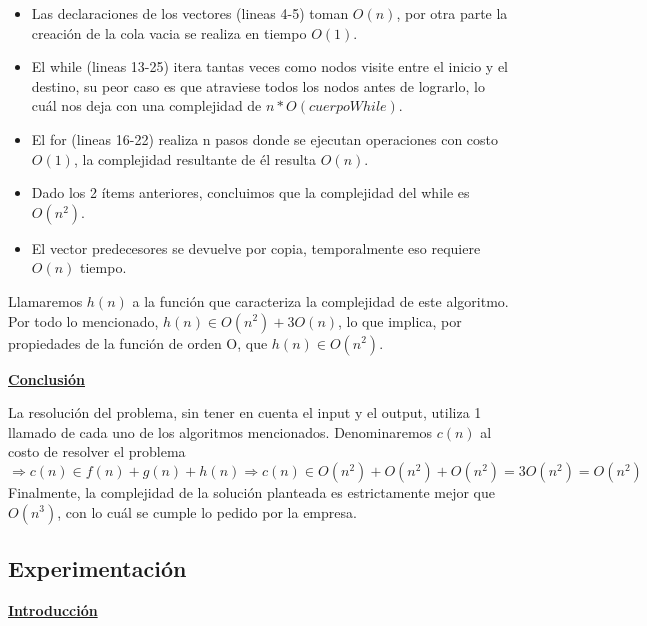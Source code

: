 \begin{itemize}
\item Las declaraciones de los vectores (lineas 4-5) toman $O(n)$, por otra parte la creación de la cola vacia se realiza en tiempo $O(1)$.
\item El while (lineas 13-25) itera tantas veces como nodos visite entre el inicio y el destino, su peor caso es que atraviese todos los nodos antes de lograrlo, lo cuál nos deja con una complejidad de $n*O(cuerpoWhile)$.
\item El for (lineas 16-22) realiza n pasos donde se ejecutan operaciones con costo $O(1)$, la complejidad resultante de él resulta $O(n)$.
\item Dado los 2 ítems anteriores, concluimos que la complejidad del while es $O(n^2)$.
\item El vector predecesores se devuelve por copia, temporalmente eso requiere $O(n)$ tiempo.
\end{itemize}

Llamaremos $h(n)$ a la función que caracteriza la complejidad de este algoritmo. Por todo lo mencionado, $h(n) \in O(n^2) + 3O(n)$, lo que implica, por propiedades de la función de orden O, que $h(n) \in O(n^2)$.

\noindent \textbf{\underline{Conclusión}}

La resolución del problema, sin tener en cuenta el input y el output, utiliza 1 llamado de cada uno de los algoritmos mencionados. Denominaremos $c(n)$ al costo de resolver el problema $\Rightarrow c(n) \in f(n) + g(n) + h(n) \Rightarrow c(n) \in O(n^2) + O(n^2) + O(n^2) = 3O(n^2) = O(n^2)$
Finalmente, la complejidad de la solución planteada es estrictamente mejor que $O(n^3)$, con lo cuál se cumple lo pedido por la empresa.

\newpage
\subsection{Experimentación}

\noindent \textbf{\underline{Introducción}}

